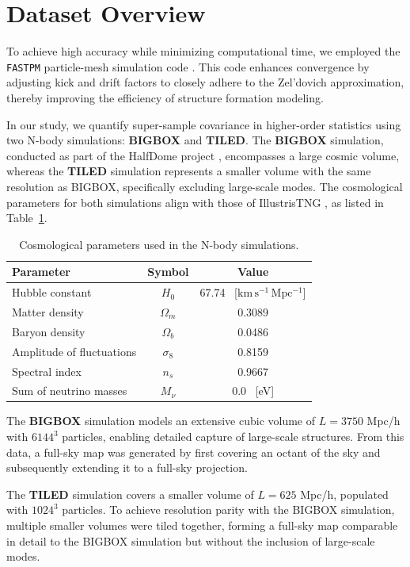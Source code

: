 
\section{Dataset Overview}
To achieve high accuracy while minimizing computational time, we employed the \texttt{FASTPM} particle-mesh simulation code \citep{10.1093/mnras/stw2123}. This code enhances convergence by adjusting kick and drift factors to closely adhere to the Zel'dovich approximation, thereby improving the efficiency of structure formation modeling.

In our study, we quantify super-sample covariance in higher-order statistics using two N-body simulations: \textbf{BIGBOX} and \textbf{TILED}. The \textbf{BIGBOX} simulation, conducted as part of the HalfDome project \citep{2024arXiv240717462B}, encompasses a large cosmic volume, whereas the \textbf{TILED} simulation represents a smaller volume with the same resolution as BIGBOX, specifically excluding large-scale modes. The cosmological parameters for both simulations align with those of IllustrisTNG \citep{2019ComAC...6....2N}, as listed in Table~\ref{tab:simulations}.

\begin{table}[h]
\centering
\begin{tabular}{lcc}
\toprule
\textbf{Parameter} & \textbf{Symbol} & \textbf{Value} \\
\midrule
Hubble constant & $H_0$ & 67.74 \, [$\mathrm{km\,s^{-1}\,Mpc^{-1}}$] \\ 
Matter density & $\Omega_m$ & 0.3089 \\
Baryon density & $\Omega_b$ & 0.0486 \\
Amplitude of fluctuations & $\sigma_8$ & 0.8159 \\
Spectral index & $n_s$ & 0.9667 \\
Sum of neutrino masses & $M_{\nu}$ & 0.0 \, [eV] \\
\bottomrule
\end{tabular}
\caption{Cosmological parameters used in the N-body simulations.}\label{tab:simulations}
\end{table}

The \textbf{BIGBOX} simulation models an extensive cubic volume of $L = 3750$ Mpc/h with $6144^3$ particles, enabling detailed capture of large-scale structures. From this data, a full-sky map was generated by first covering an octant of the sky and subsequently extending it to a full-sky projection.

The \textbf{TILED} simulation covers a smaller volume of $L = 625$ Mpc/h, populated with $1024^3$ particles. To achieve resolution parity with the BIGBOX simulation, multiple smaller volumes were tiled together, forming a full-sky map comparable in detail to the BIGBOX simulation but without the inclusion of large-scale modes.

